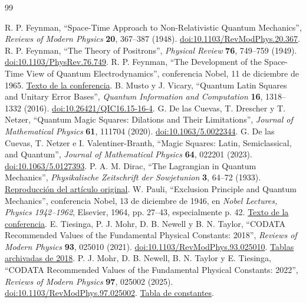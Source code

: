 \begin{thebibliography}{99}
{}
 R. P. Feynman, ``Space-Time Approach to Non-Relativistic Quantum Mechanics'', \emph{Reviews of Modern Physics} \textbf{20}, 367--387 (1948). \href{https://doi.org/10.1103/RevModPhys.20.367}{doi:10.1103/RevModPhys.20.367}.
 R. P. Feynman, ``The Theory of Positrons'', \emph{Physical Review} \textbf{76}, 749--759 (1949). \href{https://doi.org/10.1103/PhysRev.76.749}{doi:10.1103/PhysRev.76.749}.
 R. P. Feynman, ``The Development of the Space-Time View of Quantum Electrodynamics'', conferencia Nobel, 11 de diciembre de 1965. \href{https://www.nobelprize.org/prizes/physics/1965/feynman/lecture/}{Texto de la conferencia}.
 B. Musto y J. Vicary, ``Quantum Latin Squares and Unitary Error Bases'', \emph{Quantum Information and Computation} \textbf{16}, 1318--1332 (2016). \href{https://doi.org/10.26421/QIC16.15-16-4}{doi:10.26421/QIC16.15-16-4}.
 G. De las Cuevas, T. Drescher y T. Netzer, ``Quantum Magic Squares: Dilations and Their Limitations'', \emph{Journal of Mathematical Physics} \textbf{61}, 111704 (2020). \href{https://doi.org/10.1063/5.0022344}{doi:10.1063/5.0022344}.
 G. De las Cuevas, T. Netzer e I. Valentiner-Branth, ``Magic Squares: Latin, Semiclassical, and Quantum'', \emph{Journal of Mathematical Physics} \textbf{64}, 022201 (2023). \href{https://doi.org/10.1063/5.0127393}{doi:10.1063/5.0127393}.
 P. A. M. Dirac, ``The Lagrangian in Quantum Mechanics'', \emph{Physikalische Zeitschrift der Sowjetunion} \textbf{3}, 64--72 (1933). \href{https://www.informationphilosopher.com/solutions/scientists/dirac/Lagrangian_1933.pdf}{Reproducción del artículo original}.
 W. Pauli, ``Exclusion Principle and Quantum Mechanics'', conferencia Nobel, 13 de diciembre de 1946, en \emph{Nobel Lectures, Physics 1942--1962}, Elsevier, 1964, pp. 27--43, especialmente p. 42. \href{https://www.nobelprize.org/uploads/2018/06/pauli-lecture.pdf}{Texto de la conferencia}.
 E. Tiesinga, P. J. Mohr, D. B. Newell y B. N. Taylor, ``CODATA Recommended Values of the Fundamental Physical Constants: 2018'', \emph{Reviews of Modern Physics} \textbf{93}, 025010 (2021). \href{https://doi.org/10.1103/RevModPhys.93.025010}{doi:10.1103/RevModPhys.93.025010}. \href{https://physics.nist.gov/cuu/Constants/ArchiveASCII/allascii_2018.txt}{Tablas archivadas de 2018}.
 P. J. Mohr, D. B. Newell, B. N. Taylor y E. Tiesinga, ``CODATA Recommended Values of the Fundamental Physical Constants: 2022'', \emph{Reviews of Modern Physics} \textbf{97}, 025002 (2025). \href{https://doi.org/10.1103/RevModPhys.97.025002}{doi:10.1103/RevModPhys.97.025002}. \href{https://physics.nist.gov/cuu/Constants/Table/allascii.txt}{Tabla de constantes}.

\end{thebibliography}
